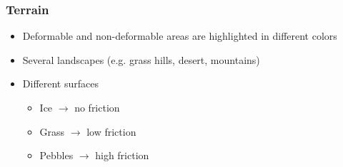 \documentclass[xcolor=dvipsnames]{beamer}
\begin{document}
	\begin{frame}
		\frametitle{Terrain}
		\begin{itemize}
			\setlength\itemsep{1.5em}
			\item Deformable and non-deformable areas are highlighted in different colors
			\item Several landscapes (e.g. grass hills, desert, mountains)
			\item Different surfaces
			\begin{itemize}
				\item Ice $\rightarrow$ no friction
				\item Grass $\rightarrow$ low friction
				\item Pebbles $\rightarrow$ high friction
			\end{itemize}
		\end{itemize}
	\end{frame}
	
\end{document}
